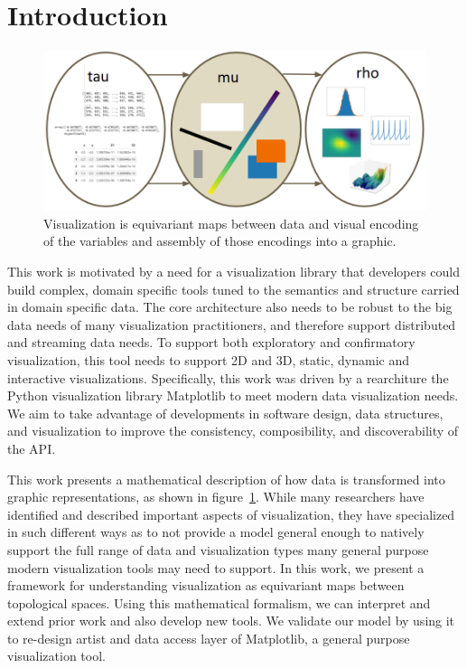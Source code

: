 \documentclass[../main.tex]{subfiles}
\begin{document}
\section{Introduction}
\label{sec:intro}
\begin{figure}[H]
    \includegraphics[width=\textwidth]{figures/math/dar.png}
    \caption{Visualization is equivariant maps between data and visual encoding of the variables and assembly of those encodings into a graphic.
    }
    \label{fig:intro_artist_stages}
\end{figure}

 This work is motivated by a need for a visualization library that developers could build complex, domain specific tools tuned to the semantics and structure carried in domain specific data. The core architecture also needs to be robust to the big data needs of many visualization practitioners, and therefore support distributed and streaming data needs. To support both exploratory and confirmatory visualization\cite{tukeyWeNeedBoth1980}, this tool needs to support 2D and 3D,  static, dynamic and interactive visualizations. Specifically, this work was driven by a rearchiture the Python visualization library Matplotlib\cite{hunterMatplotlib2DGraphics2007} to meet modern data visualization needs. We aim to take advantage of developments in software design, data structures, and visualization to improve the consistency, composibility, and discoverability of the API. 

 This work presents a mathematical description of how data is transformed into graphic representations, as shown in figure~\ref{fig:intro_artist_stages}. While many researchers have identified and described important aspects of visualization, they have specialized in such different ways as to not provide a model general enough to natively support the full range of data and visualization types many general purpose modern visualization tools may need to support. In this work, we present a framework for understanding visualization as equivariant maps between topological spaces. Using this mathematical formalism, we can interpret and extend prior work and also develop new tools. We validate our model by using it to re-design artist and data access layer of Matplotlib, a general purpose visualization tool.
 
\end{document}
